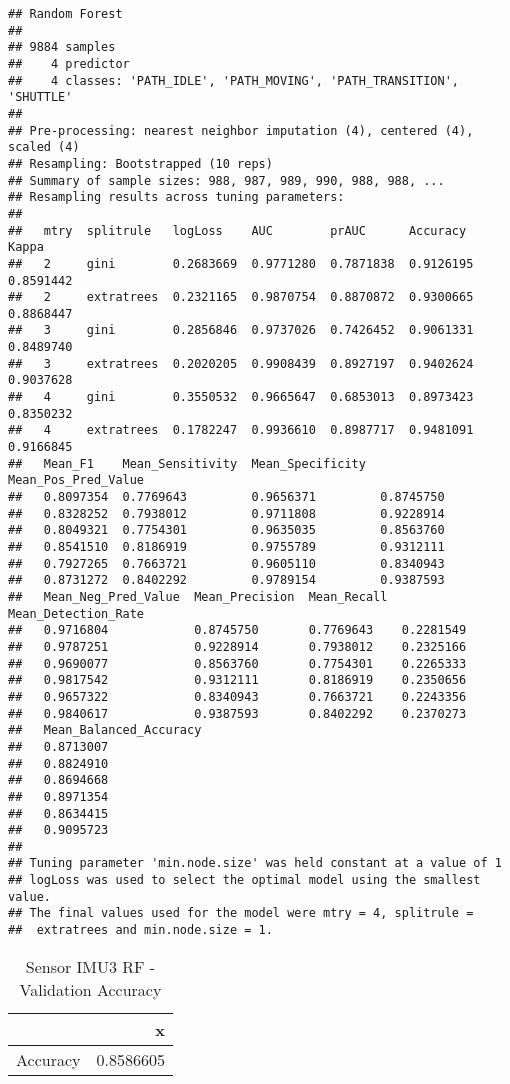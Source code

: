 \documentclass[]{article}
\begin{document}
\begin{verbatim}
## Random Forest 
## 
## 9884 samples
##    4 predictor
##    4 classes: 'PATH_IDLE', 'PATH_MOVING', 'PATH_TRANSITION', 'SHUTTLE' 
## 
## Pre-processing: nearest neighbor imputation (4), centered (4), scaled (4) 
## Resampling: Bootstrapped (10 reps) 
## Summary of sample sizes: 988, 987, 989, 990, 988, 988, ... 
## Resampling results across tuning parameters:
## 
##   mtry  splitrule   logLoss    AUC        prAUC      Accuracy   Kappa    
##   2     gini        0.2683669  0.9771280  0.7871838  0.9126195  0.8591442
##   2     extratrees  0.2321165  0.9870754  0.8870872  0.9300665  0.8868447
##   3     gini        0.2856846  0.9737026  0.7426452  0.9061331  0.8489740
##   3     extratrees  0.2020205  0.9908439  0.8927197  0.9402624  0.9037628
##   4     gini        0.3550532  0.9665647  0.6853013  0.8973423  0.8350232
##   4     extratrees  0.1782247  0.9936610  0.8987717  0.9481091  0.9166845
##   Mean_F1    Mean_Sensitivity  Mean_Specificity  Mean_Pos_Pred_Value
##   0.8097354  0.7769643         0.9656371         0.8745750          
##   0.8328252  0.7938012         0.9711808         0.9228914          
##   0.8049321  0.7754301         0.9635035         0.8563760          
##   0.8541510  0.8186919         0.9755789         0.9312111          
##   0.7927265  0.7663721         0.9605110         0.8340943          
##   0.8731272  0.8402292         0.9789154         0.9387593          
##   Mean_Neg_Pred_Value  Mean_Precision  Mean_Recall  Mean_Detection_Rate
##   0.9716804            0.8745750       0.7769643    0.2281549          
##   0.9787251            0.9228914       0.7938012    0.2325166          
##   0.9690077            0.8563760       0.7754301    0.2265333          
##   0.9817542            0.9312111       0.8186919    0.2350656          
##   0.9657322            0.8340943       0.7663721    0.2243356          
##   0.9840617            0.9387593       0.8402292    0.2370273          
##   Mean_Balanced_Accuracy
##   0.8713007             
##   0.8824910             
##   0.8694668             
##   0.8971354             
##   0.8634415             
##   0.9095723             
## 
## Tuning parameter 'min.node.size' was held constant at a value of 1
## logLoss was used to select the optimal model using the smallest value.
## The final values used for the model were mtry = 4, splitrule =
##  extratrees and min.node.size = 1.
\end{verbatim}

\begin{table}[!h]

\caption{\label{tab:sensor-rf-results}Sensor IMU3 RF - Validation Accuracy}
\centering
\begin{tabular}[t]{lr}
\toprule
  & x\\
\midrule
Accuracy & 0.8586605\\
\bottomrule
\end{tabular}
\end{table}
\end{document}
